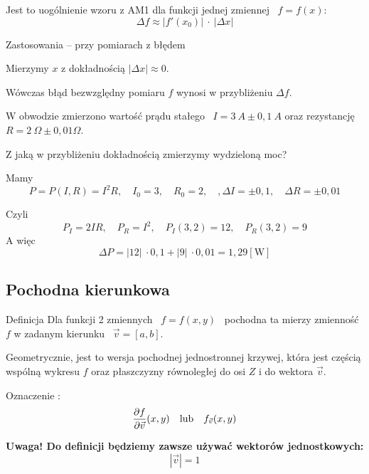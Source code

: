 Jest to uogólnienie wzoru z AM1 dla funkcji jednej zmiennej \ $ f = f(x) $:
\[ \Delta f \approx | f'(x_0) | \ \cdot \ | \Delta x | \]

Zastosowania -- przy pomiarach z błędem

Mierzymy $x$ z dokładnością $ | \Delta x| \approx 0 $.

Wówczas błąd bezwzględny pomiaru $f$ wynosi w przybliżeniu $ \Delta f $.

\begin{przyklad}
    W obwodzie zmierzono wartość prądu stałego \ $ I = 3 \ A \pm 0,1 \ A $ oraz rezystancję \ $ R = 2 \ \Omega \pm 0,01 \Omega $.

    Z jaką w przybliżeniu dokładnością zmierzymy wydzieloną moc? \bigskip

    Mamy
    \[ P = P(I, R) = I^2 R, \quad I_0 = 3, \quad R_0 = 2, \quad, \Delta I = \pm 0,1, \quad \Delta R = \pm 0,01 \]

    Czyli
    \[ P_I = 2 IR, \quad P_R = I^2, \quad P_I(3,2) = 12, \quad P_R(3,2) = 9 \]
    A więc
    \[ \Delta P = |12| \ \cdot 0,1 + |9| \ \cdot 0,01 = 1,29 [\textrm{W}] \]
\end{przyklad}


\subsection*{Pochodna kierunkowa}

\begin{tw}{Definicja}
    Dla funkcji 2 zmiennych \ $ f = f(x,y) $ \ pochodna ta mierzy zmienność $f$ w zadanym kierunku \ $ \vec{v} = [a,b] $.

    Geometrycznie, jest to wersja pochodnej jednostronnej krzywej, która jest częścią wspólną wykresu $f$ oraz płaszczyzny równoległej
    do osi $Z$ i do wektora $\vec{v}$.

    Oznaczenie :
    \[ \frac{\partial f}{\partial \vec{v}}(x,y) \quad \text{lub} \quad f_{\vec{v}}(x,y) \]
\end{tw}

\textbf{Uwaga! Do definicji będziemy zawsze używać wektorów jednostkowych:}
\[ |\vec{v}| = 1 \]

